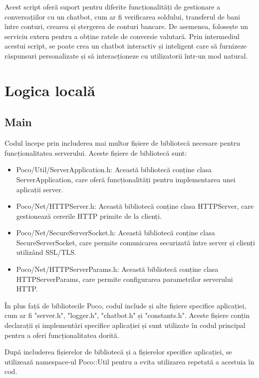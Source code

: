 Acest script oferă suport pentru diferite funcționalități de gestionare a conversațiilor cu un chatbot, cum ar fi verificarea soldului, transferul de bani între conturi, crearea și ștergerea de conturi bancare. De asemenea, folosește un serviciu extern pentru a obține ratele de conversie valutară. Prin intermediul acestui script, se poate crea un chatbot interactiv și inteligent care să furnizeze răspunsuri personalizate și să interacționeze cu utilizatorii într-un mod natural.

\section{Logica locală}

\subsection{Main}

Codul începe prin includerea mai multor fișiere de bibliotecă necesare pentru funcționalitatea serverului. Aceste fișiere de bibliotecă sunt:

\begin{itemize}
  \item Poco/Util/ServerApplication.h: Această bibliotecă conține clasa ServerApplication, care oferă funcționalități pentru implementarea unei aplicații server.
  \item Poco/Net/HTTPServer.h: Această bibliotecă conține clasa HTTPServer, care gestionează cererile HTTP primite de la clienți.
  \item Poco/Net/SecureServerSocket.h: Această bibliotecă conține clasa SecureServerSocket, care permite comunicarea securizată între server și clienți utilizând SSL/TLS.
  \item Poco/Net/HTTPServerParams.h: Această bibliotecă conține clasa HTTPServerParams, care permite configurarea parametrilor serverului HTTP.
\end{itemize}

În plus față de bibliotecile Poco, codul include și alte fișiere specifice aplicației, cum ar fi "server.h", "logger.h", "chatbot.h" și "constants.h". Aceste fișiere conțin declarații și implementări specifice aplicației și sunt utilizate în codul principal pentru a oferi funcționalitatea dorită.

După includerea fișierelor de bibliotecă și a fișierelor specifice aplicației, se utilizează namespace-ul Poco::Util pentru a evita utilizarea repetată a acestuia în cod.

